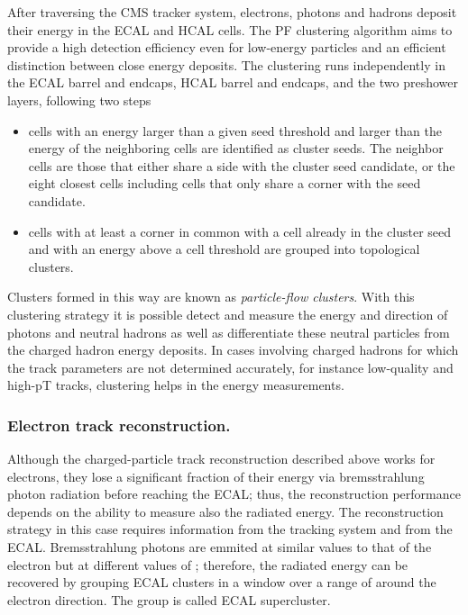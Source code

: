 \noindent After traversing the CMS tracker system, electrons, photons and hadrons deposit their energy in the ECAL and HCAL cells. The PF clustering algorithm aims to provide a high detection efficiency even for low-energy particles and an efficient distinction between close energy deposits. The clustering runs independently in the ECAL barrel and endcaps, HCAL barrel and endcaps, and the two preshower layers, following two steps
\begin{itemize}
\item cells with an energy larger than a given seed threshold and larger than the energy of the neighboring cells are identified as cluster seeds. The neighbor cells are those that either share a side with the cluster seed candidate, or the eight closest cells including cells that only share a corner with the seed candidate.
\item cells with at least a corner in common with a cell already in the cluster seed and with an energy above a cell threshold are grouped into topological clusters.
\end{itemize}

\noindent Clusters formed in this way are known as \textit{particle-flow clusters}. With this clustering strategy it is possible detect and measure the energy and direction of photons and neutral hadrons as well as differentiate these neutral particles from the charged hadron energy deposits. In cases involving charged hadrons for which the track parameters are not determined accurately, for instance low-quality and high-pT tracks, clustering helps in the energy measurements. 

\subsubsection*{Electron track reconstruction.}

\noindent Although the charged-particle track reconstruction described above works for electrons, they lose a significant fraction of their energy via bremsstrahlung photon radiation before reaching the ECAL; thus, the reconstruction performance depends on the ability to measure also the radiated energy. The reconstruction strategy in this case requires information from the tracking system and from the ECAL. Bremsstrahlung photons are emmited at similar \etac values to that of the electron but at different values of \phic; therefore, the radiated energy can be recovered by grouping ECAL clusters in a \etac window over a range of \phic around the electron direction. The group is called ECAL supercluster.\\

